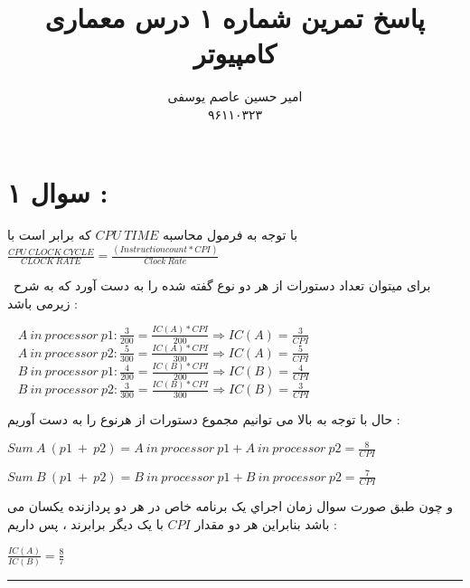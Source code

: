 \documentclass{article}
\title{پاسخ تمرین شماره ۱ درس معماری کامپیوتر}
\author{امیر حسین عاصم یوسفی \\ ۹۶۱۱۰۳۲۳}
\begin{document}
  \maketitle
  \section*{ سوال ۱  : }
  با توجه به فرمول محاسبه 
  $CPU  \ TIME$
  که برابر است با 
  $ \frac{CPU \  CLOCK \  CYCLE}{ CLOCK \  RATE} = \frac{(Instruction count *CPI)}{Clock  \  Rate}$
  
  برای میتوان تعداد دستورات از هر دو نوع گفته شده را به دست آورد که به شرح زیرمی باشد  : 
  \begin{center}
  	$A  \ in  \ processor  \  p1 : \frac{3}{200} = \frac{IC(A) * CPI}{200} \Rightarrow IC(A) = \frac{3}{CPI} $\\
  	$A  \ in  \ processor  \  p2 : \frac{5}{300} = \frac{IC(A) * CPI}{300} \Rightarrow IC(A) = \frac{5}{CPI} $\\
  	$ B  \ in  \ processor  \  p1 : \frac{4}{200} = \frac{IC(B) * CPI}{200} \Rightarrow IC(B) = \frac{4}{CPI}$\\
  	$ B  \ in  \ processor  \  p2 : \frac{3}{300} = \frac{IC(B) * CPI}{300} \Rightarrow IC(B) = \frac{3}{CPI}$
  \end{center}
حال با توجه به بالا  می توانیم مجموع دستورات از هرنوع را به دست آوریم  : 
 \begin{center}
 	$Sum \ A \  (p1 \  + \  p2)  = A  \ in  \ processor  \  p1 + A  \ in  \ processor  \  p2 = \frac{8}{CPI}$
 	
 \end{center}
\begin{center}
	$ Sum \ B \  (p1 \  + \  p2)  = B  \ in  \ processor  \  p1 + B  \ in  \ processor  \  p2 = \frac{7}{CPI}$
\end{center}
و چون طبق صورت سوال زمان اجراي یک برنامه خاص در هر دو پردازنده یکسان می باشد بنابراین هر دو مقدار 
$CPI$
با یک دیگر برابرند ، پس داریم : 
\begin{center}
	$  \frac{IC(A)}{IC(B)} = \frac{8}{7}$
\end{center}
\hrule
\end{document}
